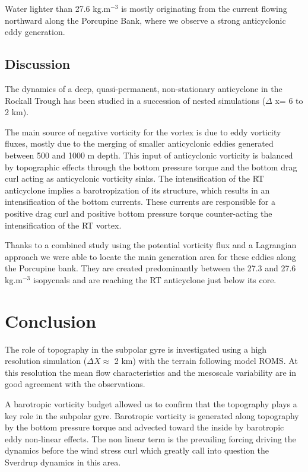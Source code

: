 \documentclass[11pt,a4paper]{article}
\begin{document}
Water lighter than 27.6 kg.m$^{-3}$ is mostly originating from the current flowing northward along the Porcupine Bank, where we observe a strong anticyclonic eddy generation.


\subsection{Discussion }

The dynamics of a deep, quasi-permanent, non-stationary anticyclone in the Rockall Trough has been studied in a succession of nested simulations ($\Delta$ x= 6 to 2 km).


The main source of negative vorticity for the vortex is due to eddy vorticity fluxes, mostly due to the merging of smaller anticyclonic eddies generated between 500 and 1000 m depth. This input of anticyclonic vorticity is balanced by topographic effects through the bottom pressure torque and the bottom drag curl acting as anticyclonic vorticity sinks. The intensification of the RT anticyclone implies a barotropization of its structure, which results in an intensification of the bottom currents. These currents are responsible for a positive drag curl and positive bottom pressure torque counter-acting the intensification of the RT vortex. 

Thanks to a combined study using the potential vorticity flux and a Lagrangian approach we were able to locate the main generation area for these eddies along the Porcupine bank. They are created predominantly between the 27.3 and 27.6 kg.m$^{-3}$ isopycnals and are reaching the RT anticyclone just below its core.

\section{Conclusion}

The role of topography in the subpolar gyre is investigated using a high resolution simulation ($\Delta X \approx$ 2 km)  with the terrain following model ROMS. At this resolution the mean flow characteristics and the mesoscale variability are in good agreement with the observations.   

A barotropic vorticity budget allowed us to confirm that the topography plays a key role in the subpolar gyre. Barotropic vorticity is generated along topography by the bottom pressure torque and advected toward the inside by barotropic eddy non-linear effects. The non linear term is the prevailing forcing driving the dynamics before the wind stress curl which greatly call into question the Sverdrup dynamics in this area.
\end{document}
